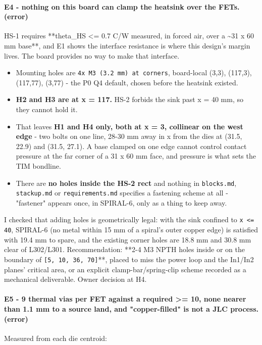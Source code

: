 \documentclass[11pt,a4paper]{article}
\begin{document}
\paragraph*{E4 - nothing on this board can clamp the heatsink over the FETs. (error)}
HS-1 requires {*}{*}theta\_HS \textless{}= 0.7 C/W measured, in forced air, over a \textasciitilde{}31 x 60 mm base{*}{*}, and E1 shows the interface resistance is where this design's margin lives. The board provides no way to make that interface.

\begin{itemize}
\item Mounting holes are \texttt{4x M3 (3.2 mm) at corners}, board-local (3,3), (117,3),
(117,77), (3,77) - the P0 Q4 default, chosen before the heatsink existed.
\item \textbf{H2 and H3 are at x = 117.} HS-2 forbids the sink past x = 40 mm, so they
cannot hold it.
\item That leaves \textbf{H1 and H4 only, both at x = 3, collinear on the west edge} -
two bolts on one line, 28-30 mm away in x from the dies at (31.5, 22.9) and
(31.5, 27.1). A base clamped on one edge cannot control contact pressure at
the far corner of a 31 x 60 mm face, and pressure is what sets the TIM
bondline.
\item There are \textbf{no holes inside the HS-2 rect} and nothing in \texttt{blocks.md},
\texttt{stackup.md} or \texttt{requirements.md} specifies a fastening scheme at all -
"fastener" appears once, in SPIRAL-6, only as a thing to keep away.
\end{itemize}
I checked that adding holes is geometrically legal: with the sink confined to \texttt{x \textless{}= 40}, SPIRAL-6 (no metal within 15 mm of a spiral's outer copper edge) is satisfied with 19.4 mm to spare, and the existing corner holes are 18.8 mm and 30.8 mm clear of L302/L301. Recommendation: {*}{*}2-4 M3 NPTH holes inside or on the boundary of \texttt{{[}5, 10, 36, 70{]}}{*}{*}, placed to miss the power loop and the In1/In2 planes' critical area, or an explicit clamp-bar/spring-clip scheme recorded as a mechanical deliverable. Owner decision at H4.

\paragraph*{E5 - 9 thermal vias per FET against a required \textgreater{}= 10, none nearer than 1.1 mm to a source land, and "copper-filled" is not a JLC process. (error)}
Measured from each die centroid:
\end{document}
